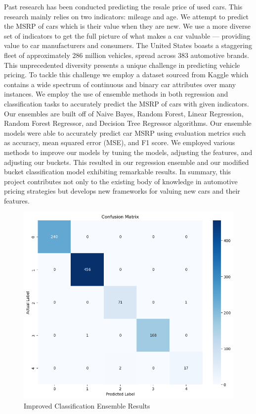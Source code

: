 \documentclass{article}
\begin{document}
Past research has been conducted predicting the resale price of used cars. This research mainly relies on two indicators: mileage and age. We attempt to predict the MSRP of cars which is their value when they are new. We use a more diverse set of indicators to get the full picture of what makes a car valuable — providing value to car manufacturers and consumers. The United States boasts a staggering fleet of approximately 286 million vehicles, spread across 383 automotive brands. This unprecedented diversity presents a unique challenge in predicting vehicle pricing. To tackle this challenge we employ a dataset sourced from Kaggle which contains a wide spectrum of continuous and binary car attributes over many instances. We employ the use of ensemble methods in both regression and classification tasks to accurately predict the MSRP of cars with given indicators. 
\newline
\newline
Our ensembles are built off of Naive Bayes, Random Forest, Linear Regression, Random Forest Regressor, and Decision Tree Regressor algorithms. Our ensemble models were able to accurately predict car MSRP using evaluation metrics such as accuracy, mean squared error (MSE), and F1 score. We employed various methods to improve our models by tuning the models, adjusting the features, and adjusting our buckets. This resulted in our regression ensemble and our modified bucket classification model exhibiting remarkable results. In summary, this project contributes not only to the existing body of knowledge in automotive pricing strategies but develops new frameworks for valuing new cars and their features.

\begin{figure}[h]
\caption{Improved Classification Ensemble Results}
\includegraphics[scale=0.5]{Simplified Matrix by string class.png}\newline
\end{figure}
\end{document}
